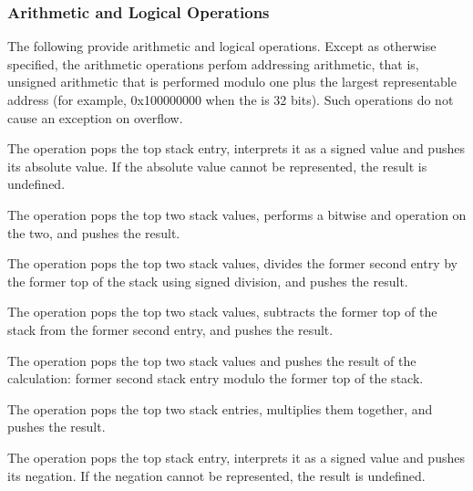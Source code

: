 \subsubsection{Arithmetic and Logical Operations}
The 
following 
provide arithmetic and logical operations. Except
as otherwise specified, the arithmetic operations perfom
addressing arithmetic, that is, unsigned arithmetic that is
performed modulo one plus the largest representable address
(for example, 0x100000000 when the 
 is 32
bits). 
Such operations do not cause an exception on overflow.
\begin{enumerate}[1. ]
The  operation pops the top stack entry, interprets
it as a signed value and pushes its absolute value. If the
absolute value cannot be represented, the result is undefined.

The  operation pops the top two stack values, performs
a bitwise and operation on the two, and pushes the result.

The  operation pops the top two stack values, divides the former second entry by
the former top of the stack using signed division, and pushes the result.

The  operation pops the top two stack values, subtracts the former top of the
stack from the former second entry, and pushes the result.

The  operation pops the top two stack values and pushes the result of the
calculation: former second stack entry modulo the former top of the stack.

The  operation pops the top two stack entries, multiplies them together, and
pushes the result.

The  operation pops the top stack entry, interprets
it as a signed value and pushes its negation. If the negation
cannot be represented, the result is undefined.


\end{enumerate}
